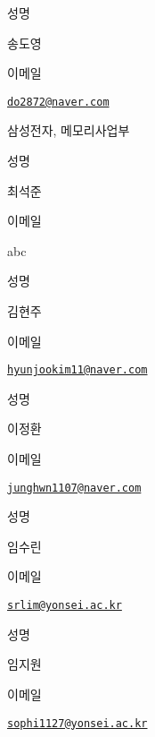 \documentclass[
]{book}
\begin{document}
성명

송도영

이메일

\href{mailto:do2872@naver.com}{\nolinkurl{do2872@naver.com}}

삼성전자, 메모리사업부

성명

최석준

이메일

abc

성명

김현주

이메일

\href{mailto:hyunjookim11@naver.com}{\nolinkurl{hyunjookim11@naver.com}}

성명

이정환

이메일

\href{mailto:junghwn1107@naver.com}{\nolinkurl{junghwn1107@naver.com}}

성명

임수린

이메일

\href{mailto:srlim@yonsei.ac.kr}{\nolinkurl{srlim@yonsei.ac.kr}}

성명

임지원

이메일

\href{mailto:sophi1127@yonsei.ac.kr}{\nolinkurl{sophi1127@yonsei.ac.kr}}

  
\end{document}
